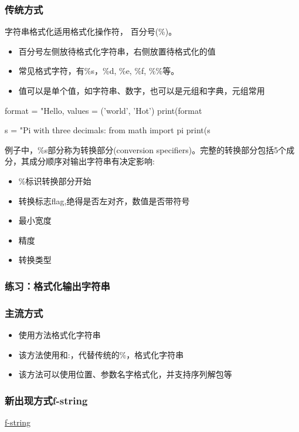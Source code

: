\subsubsection{传统方式}
字符串格式化适用格式化操作符， 百分号(\%)。
\begin{itemize}
\item 百分号左侧放待格式化字符串，右侧放置待格式化的值
\item 常见格式字符，有\%s，\%d, \%e, \%f, \%\%等。
\item 值可以是单个值，如字符串、数字，也可以是元组和字典，元组常用
\end{itemize}
  \begin{python}
format = "Hello, %
values = ('world', 'Hot')
print(format %

s = "Pi with three decimals: %
from math import pi
print(s %
\end{python}
例子中，\%s部分称为转换部分(conversion specifiers)。完整的转换部分包括5个成分，其成分顺序对输出字符串有决定影响:
\begin{itemize}
\item \%标识转换部分开始
\item 转换标志flag,绝得是否左对齐，数值是否带符号
\item 最小宽度
\item 精度
\item 转换类型
\end{itemize}
\subsubsection{练习：格式化输出字符串}
\subsubsection{主流方式}
\begin{itemize}
\item 使用方法格式化字符串
\item 该方法使用{}和:，代替传统的\%，格式化字符串
\item 该方法可以使用位置、参数名字格式化，并支持序列解包等
\end{itemize}
\subsubsection{新出现方式f-string}
\href{https://docs.python.org/3/reference/lexical_analysis.html#f-strings}{f-string}
